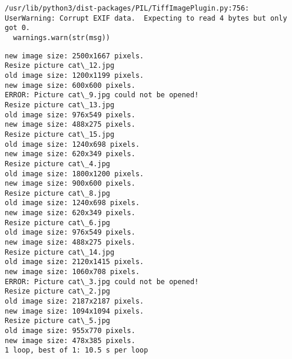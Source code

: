 \documentclass[11pt]{article}
\begin{document}
    \begin{Verbatim}[commandchars=\\\{\}]
/usr/lib/python3/dist-packages/PIL/TiffImagePlugin.py:756: UserWarning: Corrupt EXIF data.  Expecting to read 4 bytes but only got 0. 
  warnings.warn(str(msg))

    \end{Verbatim}

    \begin{Verbatim}[commandchars=\\\{\}]
new image size: 2500x1667 pixels.
Resize picture cat\_12.jpg
old image size: 1200x1199 pixels.
new image size: 600x600 pixels.
ERROR: Picture cat\_9.jpg could not be opened!
Resize picture cat\_13.jpg
old image size: 976x549 pixels.
new image size: 488x275 pixels.
Resize picture cat\_15.jpg
old image size: 1240x698 pixels.
new image size: 620x349 pixels.
Resize picture cat\_4.jpg
old image size: 1800x1200 pixels.
new image size: 900x600 pixels.
Resize picture cat\_8.jpg
old image size: 1240x698 pixels.
new image size: 620x349 pixels.
Resize picture cat\_6.jpg
old image size: 976x549 pixels.
new image size: 488x275 pixels.
Resize picture cat\_14.jpg
old image size: 2120x1415 pixels.
new image size: 1060x708 pixels.
ERROR: Picture cat\_3.jpg could not be opened!
Resize picture cat\_2.jpg
old image size: 2187x2187 pixels.
new image size: 1094x1094 pixels.
Resize picture cat\_5.jpg
old image size: 955x770 pixels.
new image size: 478x385 pixels.
1 loop, best of 1: 10.5 s per loop

    \end{Verbatim}
\end{document}
